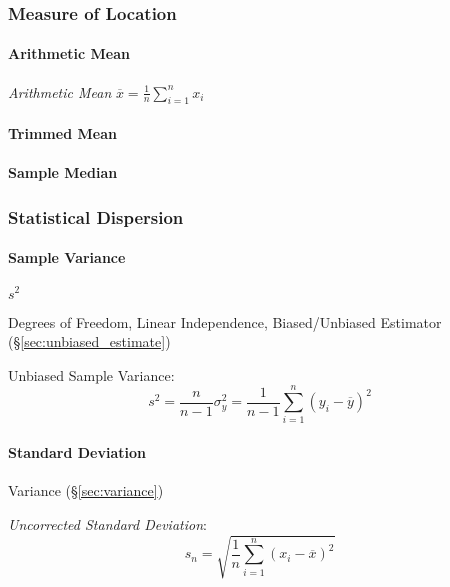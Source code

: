 \subsubsection{Measure of Location}\label{sec:location_measure}

\paragraph{Arithmetic Mean}\label{sec:arithmetic_mean}\hfill

\emph{Arithmetic Mean} $\overline{x} = \frac{1}{n}\sum_{i=1}^n x_i$



\paragraph{Trimmed Mean}\label{sec:trimmed_mean}\hfill

\paragraph{Sample Median}\label{sec:median}\hfill



\subsubsection{Statistical Dispersion}\label{sec:statistical_dispersion}

\paragraph{Sample Variance}\label{sec:variability}\hfill

$s^2$

Degrees of Freedom, Linear Independence, Biased/Unbiased Estimator
(\S\ref{sec:unbiased_estimate})

Unbiased Sample Variance:
\[
  s^2 = \frac{n}{n-1}\sigma^2_y =
  \frac{1}{n-1} \sum_{i=1}^n (y_i - \overline{y})^2
\]



\paragraph{Standard Deviation}\label{sec:standard_deviation}\hfill

Variance (\S\ref{sec:variance})

\emph{Uncorrected Standard Deviation}:
\[
  s_n = \sqrt{\frac{1}{n}\sum_{i=1}^n (x_i - \overline{x})^2}
\]

